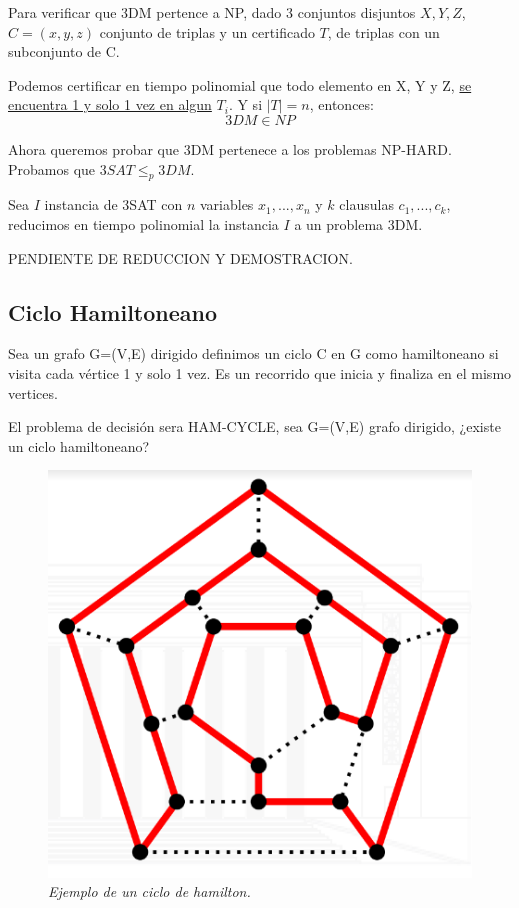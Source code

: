 \documentclass{article}
\begin{document}
Para verificar que 3DM pertence a NP, dado 3 conjuntos disjuntos \(X, Y, Z\), \(C=(x,y,z)\) 
conjunto de triplas y un certificado \(T\), de triplas con un subconjunto de C.

Podemos certificar en tiempo polinomial que todo elemento en X, Y y Z, \underline{se encuentra 1 
y solo 1 vez en algun} \(T_i\). Y si \(|T|=n\), entonces:
\[
    3DM \in NP
\] 

Ahora queremos probar que 3DM pertenece a los problemas NP-HARD. Probamos que \(3SAT \leq_p 3DM\).

Sea \(I\) instancia de 3SAT con \(n\) variables \(x_1,...,x_n\) y \(k\) clausulas \(c_1,...,c_k\), 
reducimos en tiempo polinomial la instancia \(I\) a un problema 3DM.

PENDIENTE DE REDUCCION Y DEMOSTRACION.

\subsection{Ciclo Hamiltoneano}
Sea un grafo G=(V,E) dirigido definimos un ciclo C en G como hamiltoneano si visita cada vértice
1 y solo 1 vez. Es un recorrido que inicia y finaliza en el mismo vertices.

El problema de decisión sera HAM-CYCLE, sea G=(V,E) grafo dirigido, ¿existe un ciclo hamiltoneano?


\begin{figure}[h!]
    \begin{center} 
    \includegraphics[scale=0.3]{imagenes/ejemplo-ciclo-hamilton.png}
    \caption{\small \sl Ejemplo de un ciclo de hamilton.\label{fig:hamilton-ej}} 
    \end{center}
\end{figure}
\end{document}
